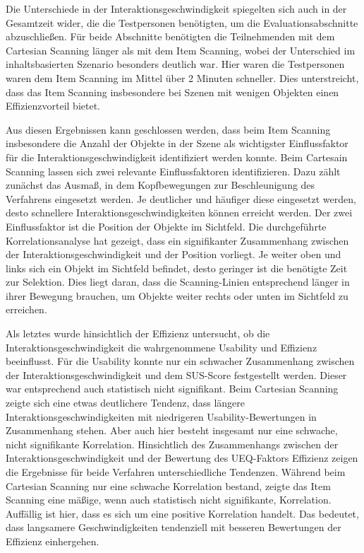Die Unterschiede in der Interaktionsgeschwindigkeit spiegelten sich auch in der Gesamtzeit wider, die die Testpersonen benötigten, um die Evaluationsabschnitte abzuschließen. Für beide Abschnitte benötigten die Teilnehmenden mit dem Cartesian Scanning länger als mit dem Item Scanning, wobei der Unterschied im inhaltsbasierten Szenario besonders deutlich war. Hier waren die Testpersonen waren dem Item Scanning im Mittel über 2 Minuten schneller.  Dies unterstreicht, dass das Item Scanning insbesondere bei Szenen mit wenigen Objekten einen Effizienzvorteil bietet.

Aus diesen Ergebnissen kann geschlossen werden, dass beim Item Scanning insbesondere die Anzahl der Objekte in der Szene als wichtigster Einflussfaktor für die Interaktionsgeschwindigkeit identifiziert werden konnte. Beim Cartesain Scanning lassen sich zwei relevante Einflussfaktoren identifizieren. Dazu zählt zunächst das Ausmaß, in dem Kopfbewegungen zur Beschleunigung des Verfahrens eingesetzt werden.  Je deutlicher und häufiger diese eingesetzt werden, desto schnellere Interaktionsgeschwindigkeiten können erreicht werden. Der zwei Einflussfaktor ist die Position der Objekte im Sichtfeld. Die durchgeführte Korrelationsanalyse hat gezeigt, dass ein signifikanter Zusammenhang zwischen der Interaktionsgeschwindigkeit und der Position vorliegt. Je weiter oben und links sich ein Objekt im Sichtfeld befindet, desto geringer ist die benötigte Zeit zur Selektion. Dies liegt daran, dass die Scanning-Linien entsprechend länger in ihrer Bewegung brauchen, um Objekte weiter rechts oder unten im Sichtfeld zu erreichen. 

Als letztes wurde hinsichtlich der Effizienz untersucht, ob die Interaktionsgeschwindigkeit die wahrgenommene Usability und Effizienz beeinflusst. Für die Usability konnte nur ein schwacher Zusammenhang zwischen der Interaktionsgeschwindigkeit und dem SUS-Score festgestellt werden. Dieser war entsprechend auch statistisch nicht signifikant. Beim Cartesian Scanning zeigte sich eine etwas deutlichere Tendenz, dass längere Interaktionsgeschwindigkeiten mit niedrigeren Usability-Bewertungen in Zusammenhang stehen. Aber auch hier besteht insgesamt nur eine schwache, nicht signifikante Korrelation. 
Hinsichtlich des Zusammenhangs zwischen der Interaktionsgeschwindigkeit und der Bewertung des UEQ-Faktors Effizienz zeigen die Ergebnisse für beide Verfahren unterschiedliche Tendenzen. Während beim Cartesian Scanning nur eine schwache Korrelation bestand, zeigte das Item Scanning eine mäßige, wenn auch statistisch nicht signifikante, Korrelation. Auffällig ist hier, dass es sich um eine positive Korrelation handelt. Das bedeutet, dass langsamere Geschwindigkeiten tendenziell mit besseren Bewertungen der Effizienz einhergehen. %

